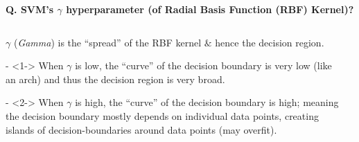 \begin{frame}[fragile]{\textbf{Q. SVM's $\gamma$ hyperparameter (of Radial Basis
      Function (RBF) Kernel)?}}
  \begin{columns}[T] %
    \begin{column}{.7\textwidth}
      \begin{wideitemize}
      \item $\gamma$ (\textit{Gamma}) is the ``spread'' of the RBF kernel $\&$
        hence the decision region.
        \begin{wideitemize}
        \item[-]<1-> When $\gamma$ is low, the ``curve'' of the decision boundary is very
          low (like an arch) and thus the decision region is very broad.
        \item[-]<2-> When $\gamma$ is high, the ``curve'' of the decision boundary is
          high; meaning the decision boundary mostly depends on individual data
          points, creating islands of decision-boundaries around data points (may overfit).
        \end{wideitemize}
      \end{wideitemize}
    \end{column}%
    \hfill%
    \begin{column}{.28\textwidth}
\end{column}
\end{columns}
\end{frame}
